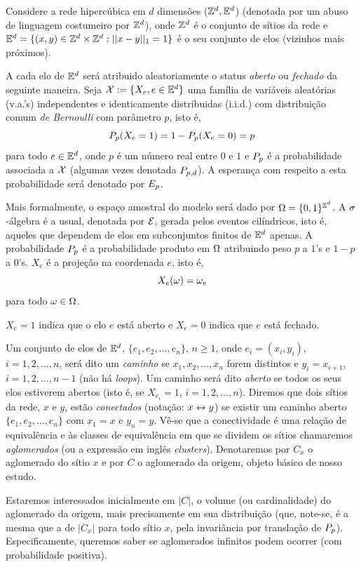 

Considere a rede hipercúbica em $d$ dimensões ($\mathbb{Z}^d,\mathbb{E}^d$) (denotada por um
abuso de linguagem costumeiro por $\mathbb{Z}^d$), onde $\mathbb{Z}^d$ é 
o conjunto de sítios da rede e $\mathbb{E}^d=\{(x,y)\in\mathbb{Z}^d \times \mathbb{Z}^d:||x-y||_1=1\}$ é o
seu conjunto de elos (vizinhos mais próximos).

A cada elo de $\mathbb{E}^d$ será atribuido aleatoriamente o status {\em aberto} ou 
{\em fechado} da seguinte maneira. Seja ${\cal X}:=\{X_e, e\in\mathbb{E}^d\}$ uma 
família de variáveis aleatórias
(v.a.'s) independentes e identicamente distribuidas (i.i.d.) com distribuição
comum {\em de Bernoulli} com parâmetro $p$, isto é,
$$P_p(X_e=1)=1-P_p(X_e=0)=p$$ para todo $e\in\mathbb{E}^d$,
onde $p$ é um número real entre $0$ e $1$ e
$P_p$ é a probabilidade associada a ${\cal X}$ (algumas vezes denotada
$P_{p,d}$). A esperança com respeito a esta probabilidade será denotado por $E_p$.

Mais formalmente, o espaço amostral do modelo será dado por $\Omega=\{0,1\}^{\mathbb{E}^d}$.
A $\sigma$-álgebra é a usual, denotada por ${\cal E}$, gerada pelos eventos 
cilíndricos, isto é, aqueles
que dependem de elos em subconjuntos finitos de $\mathbb{E}^d$ apenas. A probabilidade
$P_p$ é a probabilidade produto em $\Omega$ atribuindo peso $p$ a $1$'s e $1-p$ a
$0$'s. $X_e$ é a projeção na coordenada $e$, isto é, $$X_e(\omega)=\omega_e$$ para
todo $\omega\in\Omega$.

$X_e=1$ indica que o elo $e$ 
está aberto e $X_e=0$ indica que $e$ está fechado.

Um conjunto de elos de $\mathbb{E}^d$, $\{e_1,e_2,\ldots,e_n\},\, n\geq1$, onde $e_i=(x_i,y_i)$,
$i=1,2,\ldots,n$, será dito um {\em caminho} se $x_1,x_2,\ldots,x_n$ forem
distintos e $y_i=x_{i+1}$, $i=1,2,\ldots,n-1$ (não há {\em loops}). 
Um caminho será dito {\em aberto}
se todos os seus elos estiverem abertos (isto é, se $X_{e_i}=1$, $i=1,2,\ldots,n$).
Diremos que dois sítios da rede, $x$ e $y$, estão {\em conectados} (notação:
$x\leftrightarrow y$) se existir um caminho aberto $\{e_1,e_2,\ldots,e_n\}$ com $x_1=x$ e $y_n=y$.
Vê-se que a conectividade é uma relação de equivalência e às classes de
equivalência em que se dividem os sítios chamaremos {\em aglomerados} (ou
a expressão em inglês
{\em clusters}). Denotaremos por $C_x$ o aglomerado do sítio $x$ e por $C$
o aglomerado da origem, objeto básico de nosso estudo.

Estaremos interessados inicialmente em $|C|$, o volume (ou cardinalidade)
do aglomerado da origem, mais precisamente em sua distribuição (que, note-se,
é a mesma que a de $|C_x|$ para todo sítio $x$, pela invariância por
translação de $P_p$). Especificamente, queremos
saber se aglomerados infinitos podem ocorrer (com probabilidade positiva).

